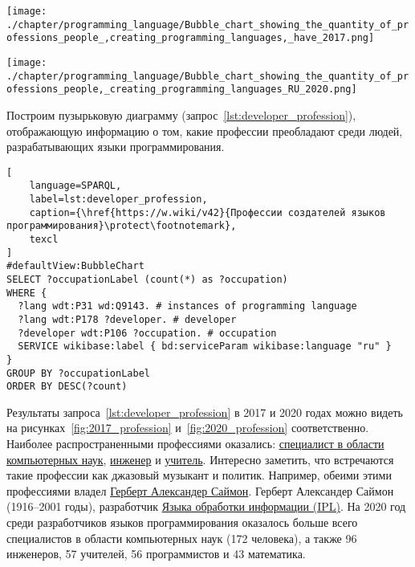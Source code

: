 \begin{marginfigure}[0pt]
\texttt{[image: ./chapter/programming\_language/Bubble\_chart\_showing\_the\_quantity\_of\_professions\_people\_,creating\_programming\_languages,\_have\_2017.png]}
  \caption[Профессии разработчиков языков программирования, 2017 год.]{Профессии разработчиков языков программирования, 2017 год. Размер пузырька показывает число разработчиков с соответствуюшей профессией.}
  \label{fig:2017_profession}
\end{marginfigure}
\begin{marginfigure}[-12pt]
\texttt{[image: ./chapter/programming\_language/Bubble\_chart\_showing\_the\_quantity\_of\_professions\_people,\_creating\_programming\_languages\_RU\_2020.png]}
  \caption[Профессии разработчиков языков программирования программирования, 2020 год.]{Профессии разработчиков языков программирования программирования, 2020 год. Размер пузырька показывает число разработчиков с соответствуюшей профессией.}
  \label{fig:2020_profession}
\end{marginfigure}
Построим пузырьковую диаграмму (запрос~\ref{lst:developer_profession}), отображающую информацию о том, какие профессии преобладают среди людей, разрабатывающих языки программирования.
\begin{lstlisting}[
	language=SPARQL,
	label=lst:developer_profession,
	caption={\href{https://w.wiki/v42}{Профессии создателей языков программирования}\protect\footnotemark},
	texcl
]
#defaultView:BubbleChart
SELECT ?occupationLabel (count(*) as ?occupation)
WHERE {
  ?lang wdt:P31 wd:Q9143. # instances of programming language 
  ?lang wdt:P178 ?developer. # developer
  ?developer wdt:P106 ?occupation. # occupation
  SERVICE wikibase:label { bd:serviceParam wikibase:language "ru" }
}
GROUP BY ?occupationLabel 
ORDER BY DESC(?count)
\end{lstlisting}

Результаты запроса~\ref{lst:developer_profession} в 2017 и 2020 годах можно видеть на рисунках~\ref{fig:2017_profession} и~\ref{fig:2020_profession} соответственно.
Наиболее распространенными профессиями оказались: 
\href{https://www.wikidata.org/wiki/Q21198}{специалист в области компьютерных наук}, 
\href{https://www.wikidata.org/wiki/Q81096}{инженер} 
и \href{https://www.wikidata.org/wiki/Q37226}{учитель}. 
Интересно заметить, что встречаются такие профессии как джазовый музыкант и политик. 
Например, обеими этими профессиями владел 
\href{https://www.wikidata.org/wiki/Q181529}{Герберт Александер Саймон}. 
Герберт Александер Саймон (1916--2001 годы), разработчик \href{https://en.wikipedia.org/wiki/Information_Processing_Language}{Языка обработки информации (IPL)}. 
На 2020 год среди разработчиков языков программирования оказалось больше всего специалистов 
в области компьютерных наук (172 человека), а также 96 инженеров, 57 учителей, 56 программистов и 43 математика.




